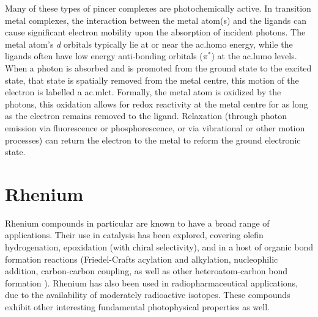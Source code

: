 Many of these types of pincer complexes are photochemically active. In transition metal complexes, the interaction between the metal atom(s) and the ligands can cause significant electron mobility upon the absorption of incident photons. The metal atom's \textit{d} orbitals typically lie at or near the \gls{ac.homo} energy, while the ligands often have low energy anti-bonding orbitals ($\pi^\ast$) at the \gls{ac.lumo} levels. When a photon is absorbed and is promoted from the ground state to the excited state, that state is spatially removed from the metal centre, this motion of the electron is labelled a \gls{ac.mlct}. Formally, the metal atom is oxidized by the photons, this oxidation allows for redox reactivity at the metal centre for as long as the electron remains removed to the ligand. Relaxation (through photon emission via fluorescence or phosphorescence, or via vibrational or other motion processes) can return the electron to the metal to reform the ground electronic state. 

\section{Rhenium}

Rhenium compounds in particular are known to have a broad range of applications. Their use in catalysis has been explored, covering olefin hydrogenation\autocite{dudle2011}, epoxidation (with chiral selectivity)\autocite{jain2008}, and in a host of organic bond formation reactions\autocite{kuninobu2011} (Friedel-Crafts acylation and alkylation\autocite{kusama1995, nishiyama2000, kuninobu2009}, nucleophilic addition\autocite{bolm2001, zhao2007}, carbon-carbon coupling\autocite{kawata2009, hori2000}, as well as other heteroatom-carbon bond formation \autocite{hua2004, adams1994, adams1996, zhao2006, muller2000}). Rhenium has also been used in radiopharmaceutical applications, due to the availability of moderately radioactive isotopes\autocite{bartholoma2009, schibli2002}. These compounds exhibit other interesting fundamental photophysical properties as well\autocite{coogan2009}. 

